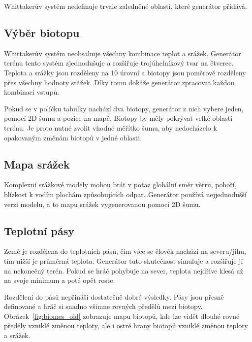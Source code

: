 \documentclass[thesis=M,czech]{FITthesis}[2019/12/23]
\begin{document}
Whittakerův systém nedefinuje trvale zaledněné oblasti, které generátor přidává.

\subsection{Výběr biotopu}
Whittakerův systém neobsahuje všechny kombinace teplot a srážek. Generátor terénu tento systém zjednodušuje a rozšiřuje trojúhelníkový tvar na čtverec. Teplota a srážky jsou rozděleny na 10 úrovní a biotopy jsou poměrově rozděleny přes všechny hodnoty srážek. Díky tomu dokáže generátor zpracovat každou kombinací vstupů.

Pokud se v políčku tabulky nachází dva biotopy, generátor z nich vybere jeden, pomocí 2D šumu a pozice na mapě. Biotopy by měly pokrývat velké oblasti terénu. Je proto nutné zvolit vhodné měřítko šumu, aby nedocházelo k opakovaným změnám biotopů v jedné oblasti.

\subsection{Mapa srážek}

Komplexní srážkové modely mohou brát v potaz globální směr větru, pohoří, blízkost k vodím plochám způsobujících odpar\dots Generátor používá nejjednodušší verzi modelu, a to mapu srážek vygenerovanou pomocí 2D šumu.

\subsection{Teplotní pásy}

Země je rozdělena do teplotních pásů, čím více se člověk nachází na severu/jihu, tím nižší je průměrná teplota. Generátor tuto skutečnost simuluje a rozšiřuje jí na nekonečný terén. Pokud se hráč pohybuje na sever, teplota nejdříve klesá až na svoje minimum a poté opět roste.

Rozdělení do pásů nepřináší dostatečně dobré výsledky. Pásy jsou přesně definované a hráč si snadno všimne rovných předělů mezi biotopy. Obrázek~\ref{fig:biomes_old} zobrazuje mapu biotopů, kde lze vidět dlouhé rovné předěly vzniklé změnou teploty, ale i ostré hrany biotopů vzniklé změnou teploty a srážek.

\end{document}
